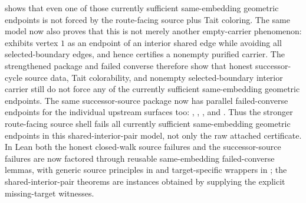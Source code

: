 \documentclass[11pt]{article}
\begin{document}
shows that even one of those currently sufficient same-embedding geometric
endpoints is not forced by the route-facing source plus Tait coloring.  The
same model now also proves that this is not merely another empty-carrier
phenomenon:
exhibits vertex \(1\) as an endpoint of an interior shared edge while avoiding
all selected-boundary edges, and hence
certifies a nonempty purified carrier.  The strengthened package
and failed converse
therefore show that honest successor-cycle source data, Tait colorability, and
nonempty selected-boundary interior carrier still do not force any of the
currently sufficient same-embedding geometric endpoints.  The
same successor-source package now has parallel failed-converse endpoints for
the individual upstream surfaces too:
,
,
,
and
.
Thus the stronger route-facing source shell fails all currently sufficient
same-embedding geometric endpoints in this shared-interior-pair model, not only
the raw attached certificate.  In Lean both the honest closed-walk source
failures and the successor-source failures are now factored through reusable
same-embedding failed-converse lemmas, with generic source principles in
 and target-specific wrappers in
; the shared-interior-pair
theorems are instances obtained by supplying the explicit missing-target
witnesses.
\end{document}
